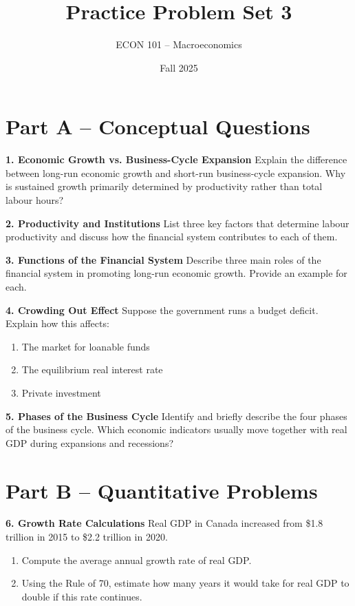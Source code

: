 \documentclass[12pt]{article}
\title{Practice Problem Set 3}
\author{ECON 101 -- Macroeconomics}
\date{Fall 2025}
\begin{document}
\maketitle

\section*{Part A – Conceptual Questions}

\textbf{1. Economic Growth vs. Business-Cycle Expansion}  
Explain the difference between long-run economic growth and short-run business-cycle expansion.  
Why is sustained growth primarily determined by productivity rather than total labour hours?



\textbf{2. Productivity and Institutions}  
List three key factors that determine labour productivity and discuss how the financial system contributes to each of them.



\textbf{3. Functions of the Financial System}  
Describe three main roles of the financial system in promoting long-run economic growth.  
Provide an example for each.



\textbf{4. Crowding Out Effect}  
Suppose the government runs a budget deficit. Explain how this affects:
\begin{enumerate}
    \item The market for loanable funds
    \item The equilibrium real interest rate
    \item Private investment
\end{enumerate}



\textbf{5. Phases of the Business Cycle}  
Identify and briefly describe the four phases of the business cycle.  
Which economic indicators usually move together with real GDP during expansions and recessions?

\newpage

\section*{Part B – Quantitative Problems}

\textbf{6. Growth Rate Calculations}  
Real GDP in Canada increased from \$1.8 trillion in 2015 to \$2.2 trillion in 2020.
\begin{enumerate}
    \item Compute the average annual growth rate of real GDP.
    \item Using the Rule of 70, estimate how many years it would take for real GDP to double if this rate continues.
\end{enumerate}
\end{document}
